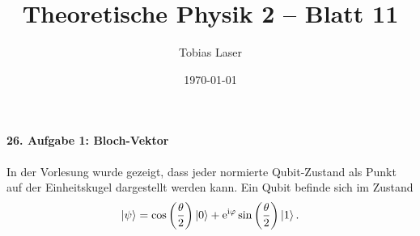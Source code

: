 \documentclass[11pt,a4paper]{scrartcl}
\newcommand{\e}{\mathrm e}
\newcommand{\ii}{\mathrm i}
\begin{document}
    \title{Theoretische Physik 2 -- Blatt 11}
    \author{Tobias Laser}
    \date{\today}
    \maketitle
    \vfill
    \thispagestyle{empty}
    \newpage


    \paragraph{26. Aufgabe 1: Bloch-Vektor}

    In der Vorlesung wurde gezeigt, dass jeder normierte Qubit-Zustand als Punkt auf der Einheitskugel dargestellt werden kann. Ein Qubit befinde sich im Zustand
    \begin{align*}
        \ket{\psi}
        =
        \cos\left(\frac{\theta}{2}\right)\ket{0}
        +
        \e^{\ii\varphi}\sin\left(\frac{\theta}{2}\right)\ket{1}.
    \end{align*}
\end{document}
